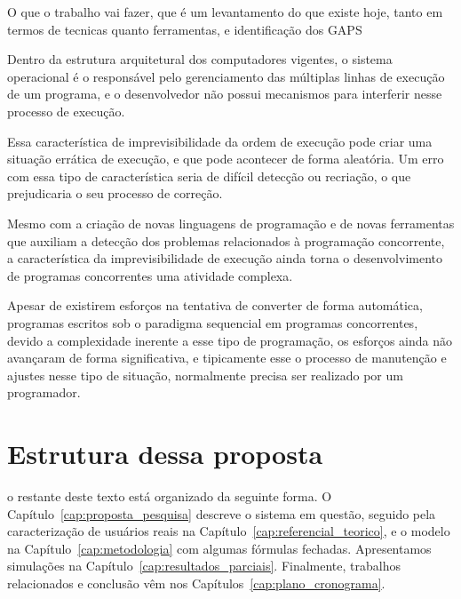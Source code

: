 O que o trabalho vai fazer, que é um levantamento do que existe hoje, tanto em termos de tecnicas quanto ferramentas, e identificação dos GAPS


Dentro da estrutura arquitetural dos computadores vigentes, o sistema operacional é o responsável pelo gerenciamento das múltiplas linhas de execução de um  programa, e o desenvolvedor não possui mecanismos para interferir nesse processo de execução. 

Essa característica de imprevisibilidade da ordem de execução pode criar uma situação errática de execução, e que pode acontecer de forma aleatória. Um erro com essa tipo de característica seria de difícil detecção ou recriação, o que prejudicaria o seu processo de correção.

Mesmo com a criação de novas linguagens de programação e de novas ferramentas que auxiliam a detecção dos problemas relacionados à programação concorrente, a característica da imprevisibilidade de execução ainda torna o desenvolvimento de programas concorrentes uma atividade complexa.

Apesar de existirem esforços na tentativa de converter de  forma automática, programas escritos sob o paradigma sequencial em programas concorrentes, devido a complexidade inerente a esse tipo de programação, os esforços ainda não avançaram de forma significativa, e tipicamente esse o processo de manutenção e ajustes nesse tipo de situação, normalmente precisa ser realizado por um programador.


\section{Estrutura dessa proposta}
	o restante deste texto está organizado da seguinte forma. O Capítulo~\ref{cap:proposta_pesquisa} descreve o sistema em questão, seguido pela caracterização de usuários reais na Capítulo~\ref{cap:referencial_teorico}, e o modelo na Capítulo~\ref{cap:metodologia} com algumas fórmulas fechadas. Apresentamos simulações na Capítulo~\ref{cap:resultados_parciais}.   Finalmente, trabalhos relacionados e conclusão vêm nos Capítulos~\ref{cap:plano_cronograma}.